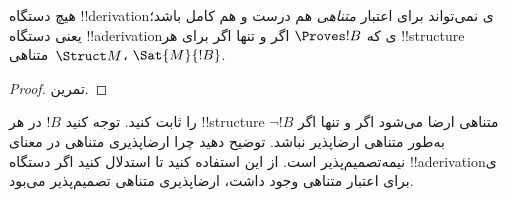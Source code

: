 \documentclass[../../../include/open-logic-section]{subfiles}
\begin{document}
\begin{cor}%
  هیچ دستگاه !!{derivation}ی نمی‌تواند برای اعتبار \emph{متناهی} هم
  درست و هم کامل باشد؛ یعنی دستگاه !!a{derivation}ی که
  $\Proves !B$ اگر و تنها اگر برای هر !!{structure} متناهی~$\Struct M$،
  $\Sat{M}{!B}$.
\end{cor}

\begin{proof}
  تمرین.
\end{proof}

\begin{prob}
   را ثابت کنید. توجه کنید
  $!B$ در هر !!{structure} متناهی ارضا می‌شود اگر و تنها اگر
  $\lnot !B$ به‌طور متناهی ارضاپذیر نباشد. توضیح دهید چرا ارضاپذیری
  متناهی در معنای 
  نیمه‌تصمیم‌پذیر است. از این استفاده کنید تا استدلال کنید اگر دستگاه
  !!a{derivation}ی برای اعتبار متناهی وجود داشت، ارضاپذیری متناهی
  تصمیم‌پذیر می‌بود.
\end{prob}
\end{document}
